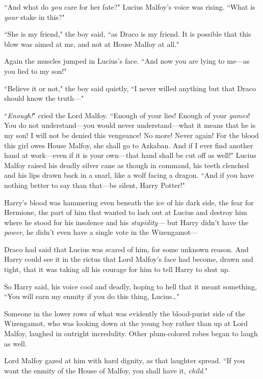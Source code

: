 ``And what do \emph{you} care for her fate?" Lucius Malfoy's voice was rising. ``What is \emph{your} stake in this?"

``She is my friend," the boy said, ``as Draco is my friend. It is possible that this blow was aimed at me, and not at House Malfoy at all."

Again the muscles jumped in Lucius's face. ``And now you are lying to me—as you lied to my son!"

``Believe it or not," the boy said quietly, ``I never willed anything but that Draco should know the truth—"

``\emph{Enough!}" cried the Lord Malfoy. ``Enough of your lies! Enough of your \emph{games}! You do not understand—you would never understand—what it means that he is my son! I will not be denied this vengeance! No more! Never again! For the blood this girl owes House Malfoy, she shall go to Azkaban. And if I ever find another hand at work—even if it is your own—that hand shall be cut off as well!" Lucius Malfoy raised his deadly silver cane as though in command, his teeth clenched and his lips drawn back in a snarl, like a wolf facing a dragon. ``And if you have nothing better to say than that—be silent, Harry Potter!"

\later

Harry's blood was hammering even beneath the ice of his dark side, the fear for Hermione, the part of him that wanted to lash out at Lucius and destroy him where he stood for his insolence and his \emph{stupidity—} but Harry didn't have the \emph{power}, he didn't even have a single vote in the Wizengamot—

Draco had said that Lucius was scared of him, for some unknown reason. And Harry could see it in the rictus that Lord Malfoy's face had become, drawn and tight, that it was taking all his courage for him to tell Harry to shut up.

So Harry said, his voice cool and deadly, hoping to hell that it meant something, ``You will earn my enmity if you do this thing, Lucius{\ldots}"

Someone in the lower rows of what was evidently the blood-purist side of the Wizengamot, who was looking down at the young boy rather than up at Lord Malfoy, laughed in outright incredulity. Other plum-colored robes began to laugh as well.

Lord Malfoy gazed at him with hard dignity, as that laughter spread. ``If you want the enmity of the House of Malfoy, you shall have it, \emph{child}."

